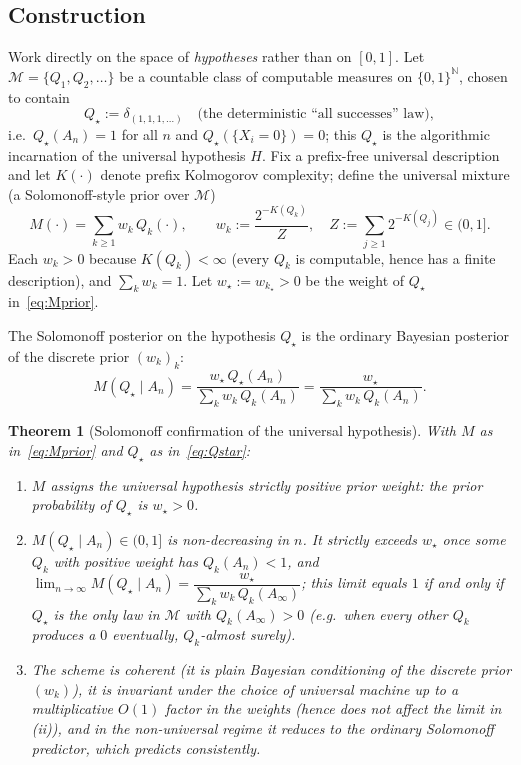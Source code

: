 \documentclass{amsart}
\newtheorem{theorem}{Theorem}
\theoremstyle{definition}
\newcommand{\N}{\mathbb{N}}
\begin{document}
\subsection{Construction}
Work directly on the space of \emph{hypotheses} rather than on $[0,1]$. Let
$\mathcal M=\{Q_1,Q_2,\dots\}$ be a countable class of computable measures on
$\{0,1\}^\N$, chosen to contain
\begin{equation}\label{eq:Qstar}
  Q_\star:=\delta_{(1,1,1,\dots)}\quad\text{(the deterministic ``all successes'' law)},
\end{equation}
i.e.\ $Q_\star(A_n)=1$ for all $n$ and $Q_\star(\{X_i=0\})=0$; this $Q_\star$ is
the algorithmic incarnation of the universal hypothesis $H$. Fix a prefix-free
universal description and let $K(\cdot)$ denote prefix Kolmogorov complexity;
define the universal mixture (a Solomonoff-style prior over $\mathcal M$)
\begin{equation}\label{eq:Mprior}
  M(\cdot)=\sum_{k\ge1} w_k\,Q_k(\cdot),\qquad
  w_k:=\frac{2^{-K(Q_k)}}{Z},\quad
  Z:=\sum_{j\ge1}2^{-K(Q_j)}\in(0,1] .
\end{equation}
Each $w_k>0$ because $K(Q_k)<\infty$ (every $Q_k$ is computable, hence has a
finite description), and $\sum_k w_k=1$. Let $w_\star:=w_{k_\star}>0$ be the
weight of $Q_\star$ in~\eqref{eq:Mprior}.

The Solomonoff posterior on the hypothesis $Q_\star$ is the ordinary Bayesian
posterior of the discrete prior $(w_k)_k$:
\begin{equation}\label{eq:solpost}
  M(Q_\star\mid A_n)=\frac{w_\star\,Q_\star(A_n)}{\sum_k w_k\,Q_k(A_n)}
  =\frac{w_\star}{\sum_k w_k\,Q_k(A_n)} .
\end{equation}

\begin{theorem}[Solomonoff confirmation of the universal hypothesis]\label{thm:sol}
With $M$ as in~\eqref{eq:Mprior} and $Q_\star$ as in~\eqref{eq:Qstar}:
\begin{enumerate}
\item[\textup{(i)}] $M$ assigns the universal hypothesis strictly positive prior
weight: the prior probability of $Q_\star$ is $w_\star>0$.
\item[\textup{(ii)}] $M(Q_\star\mid A_n)\in(0,1]$ is non-decreasing in $n$. It
strictly exceeds $w_\star$ once some $Q_k$ with positive weight has $Q_k(A_n)<1$,
and
$\lim_{n\to\infty}M(Q_\star\mid A_n)
=\dfrac{w_\star}{\sum_k w_k\,Q_k(A_\infty)}$;
this limit equals $1$ if and only if $Q_\star$ is the only law in $\mathcal M$
with $Q_k(A_\infty)>0$ (e.g.\ when every other $Q_k$ produces a $0$ eventually,
$Q_k$-almost surely).
\item[\textup{(iii)}] The scheme is coherent (it is plain Bayesian conditioning
of the discrete prior $(w_k)$), it is invariant under the choice of universal
machine up to a multiplicative $O(1)$ factor in the weights (hence does not
affect the limit in (ii)), and in the non-universal regime it reduces to the
ordinary Solomonoff predictor, which predicts consistently.
\end{enumerate}
\end{theorem}
\end{document}
